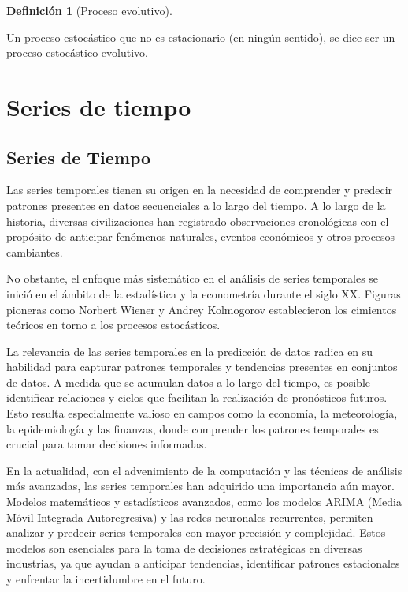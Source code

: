 \documentclass[
  us-letterpaper,
]{scrreprt}
\theoremstyle{definition}
\theoremstyle{plain}
\theoremstyle{plain}
\theoremstyle{definition}
\newtheorem{definition}{Definición}[chapter]
\theoremstyle{remark}
\begin{document}
\begin{definition}[Proceso
evolutivo]\protect\hypertarget{def-EP}{}\label{def-EP}

Un proceso estocástico que no es estacionario (en ningún sentido), se
dice ser un proceso estocástico evolutivo.

\end{definition}

\part{Series de tiempo}

\chapter{Series de Tiempo}\label{series-de-tiempo-1}

Las series temporales tienen su origen en la necesidad de comprender y
predecir patrones presentes en datos secuenciales a lo largo del tiempo.
A lo largo de la historia, diversas civilizaciones han registrado
observaciones cronológicas con el propósito de anticipar fenómenos
naturales, eventos económicos y otros procesos cambiantes.

No obstante, el enfoque más sistemático en el análisis de series
temporales se inició en el ámbito de la estadística y la econometría
durante el siglo XX. Figuras pioneras como Norbert Wiener y Andrey
Kolmogorov establecieron los cimientos teóricos en torno a los procesos
estocásticos.

La relevancia de las series temporales en la predicción de datos radica
en su habilidad para capturar patrones temporales y tendencias presentes
en conjuntos de datos. A medida que se acumulan datos a lo largo del
tiempo, es posible identificar relaciones y ciclos que facilitan la
realización de pronósticos futuros. Esto resulta especialmente valioso
en campos como la economía, la meteorología, la epidemiología y las
finanzas, donde comprender los patrones temporales es crucial para tomar
decisiones informadas.

En la actualidad, con el advenimiento de la computación y las técnicas
de análisis más avanzadas, las series temporales han adquirido una
importancia aún mayor. Modelos matemáticos y estadísticos avanzados,
como los modelos ARIMA (Media Móvil Integrada Autoregresiva) y las redes
neuronales recurrentes, permiten analizar y predecir series temporales
con mayor precisión y complejidad. Estos modelos son esenciales para la
toma de decisiones estratégicas en diversas industrias, ya que ayudan a
anticipar tendencias, identificar patrones estacionales y enfrentar la
incertidumbre en el futuro.
\end{document}
